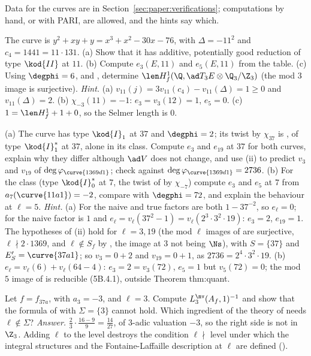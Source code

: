 \begin{sloppypar}
Data for the curves are in Section~\ref{sec:paper:verifications}; computations by hand, or with PARI, are allowed, and the hints say which.

\begin{exercise}\label{ex:paper:121a1}
The curve  is $y^2+xy+y=x^3+x^2-30x-76$, with $\Delta=-11^2$ and $c_4=1441=11\cdot131$. (a) Show that it has additive, potentially good reduction of type $\kod{II}$ at $11$. (b) Compute
$e_3(E,11)$ and $e_5(E,11)$ from the table. (c) Using $\degphi=6$,  and , determine $\len H^1_f(\Q,\ad T_3E\otimes\Q_3/\Z_3)$ (the mod $3$ image is
surjective).
\emph{Hint.} (a) $v_{11}(j)=3v_{11}(c_4)-v_{11}(\Delta)=1\ge0$ and $v_{11}(\Delta)=2$. (b) $\chi_{-3}(11)=-1$: $e_3=v_3(12)=1$, $e_5=0$. (c) $1=\len H^1_f+1+0$, so the Selmer length is $0$.
\end{exercise}

\begin{exercise}\label{ex:paper:twist-e}
(a) The curve  has type $\kod{I}_1$ at $37$ and $\degphi=2$; its twist by $\chi_{37}$ is , of type $\kod{I}_1^*$ at $37$, alone in its class. Compute $e_3$ and
$e_{19}$ at $37$ for both curves, explain why they differ although $\ad V$ does not change, and use (ii) to predict $v_3$ and $v_{19}$ of $\deg\varphi_{\curve{1369d1}}$; check
against $\deg\varphi_{\curve{1369d1}}=2736$. (b) For the class  (type $\kod{I}_0^*$ at $7$, the twist of  by $\chi_{-7}$) compute $e_3$ and $e_5$ at $7$ from $a_7(\curve{11a1})=-2$,
compare with $\degphi=72$, and explain the behaviour at $\ell=5$.
\emph{Hint.} (a) For  the naive and true factors are both $1-37^{-2}$, so $e_\ell=0$; for  the naive factor is $1$ and $e_\ell=v_\ell(37^2-1)=v_\ell(2^3\cdot3^2\cdot19)$: $e_3=2$,
$e_{19}=1$. The hypotheses of (ii) hold for $\ell=3,19$ (the mod $\ell$ images of  are surjective, $\ell\nmid2\cdot1369$, and $\ell\notin S_f$ by , the image at $3$ not being
$\Ns$), with $S=\{37\}$ and $E'_S=\curve{37a1}$; so $v_3=0+2$ and $v_{19}=0+1$, as $2736=2^4\cdot3^2\cdot19$. (b) $e_\ell=v_\ell(6)+v_\ell(64-4)$: $e_3=2=v_3(72)$, $e_5=1$ but $v_5(72)=0$; the
mod $5$ image of  is reducible (5B.4.1), outside Theorem thm:quant.
\end{exercise}

\begin{exercise}\label{ex:paper:dfg14-ell}
Let $f=f_{37a}$, with $a_3=-3$, and $\ell=3$. Compute $L^{\nv}_3(A_f,1)^{-1}$ and show that the formula of  with $\Sigma=\{3\}$ cannot hold. Which ingredient of the theory of
\cite{DFG04} needs $\ell\notin\Sigma$?
\emph{Answer.} $\frac23\cdot\frac{16-9}9=\frac{14}{27}$, of $3$-adic valuation $-3$, so the right side is not in $\Z_3$. Adding $\ell$ to the level destroys the condition $\ell\nmid$ level under which the integral
structures and the Fontaine-Laffaille description at $\ell$ are defined ().
\end{exercise}


\end{sloppypar}
